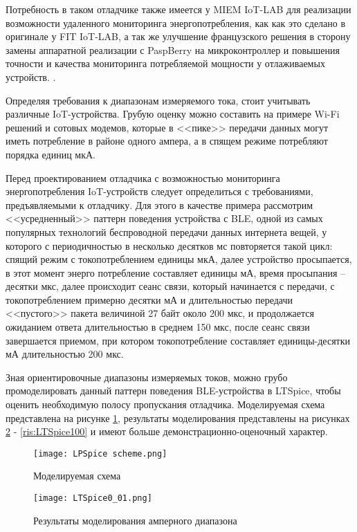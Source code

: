 Потребность в таком отладчике также имеется у MIEM IoT-LAB для реализации возможности удаленного 
мониторинга энергопотребления, как как это сделано в оригинале у FIT IoT-LAB, а так же улучшение 
французского решения в сторону замены аппаратной реализации с PaspBerry на микроконтроллер и повышения 
точности и качества мониторинга потребляемой мощности у отлаживаемых устройств. \cite{FITIoT}.

Определяя требования к диапазонам измеряемого тока, стоит учитывать различные IoT-устройства. Грубую оценку
можно составить на примере Wi-Fi решений и сотовых модемов, которые в <<пике>> передачи данных могут 
иметь потребление в районе одного ампера, а в спящем режиме потребляют порядка единиц мкА.


Перед проектированием отладчика с возможностью мониторинга энергопотребления IoT-устройств
следует определиться с требованиями, предъявляемыми к отладчику. 
Для этого в качестве примера рассмотрим <<усредненный>> паттерн поведения устройства с BLE, одной
из самых популярных технологий беспроводной передачи данных интернета вещей, 
у которого с периодичностью в несколько десятков мс повторяется такой цикл: спящий режим 
с токопотреблением единицы мкА, далее устройство просыпается, в этот момент
энерго потребление составляет единицы мА, время просыпания -- десятки мкс, далее происходит
сеанс связи, который начинается с передачи, с токопотреблением примерно десятки мА 
и длительностью передачи <<пустого>> пакета величиной 27 байт около 200 мкс, и продолжается 
ожиданием ответа длительностью в среднем 150 мкс, после сеанс связи завершается приемом,
при котором токопотребление составляет единицы-десятки мА длительностью 200 мкс.

Зная ориентировочные диапазоны измеряемых токов, можно грубо промоделировать данный паттерн 
поведения BLE-устройства в LTSpice, чтобы оценить необходимую полосу пропускания отладчика. 
Моделируемая схема представлена на рисунке \ref{ris:LTSpiceScheme}, результаты моделирования 
представлены на рисунках \ref{ris:LTSpice0_01} - \ref{ris:LTSpice100} и имеют больше 
демонстрационно-оценочный характер.

\begin{figure}[H]
  \centering
  \texttt{[image: LPSpice scheme.png]}
  \caption{Моделируемая схема}
  \label{ris:LTSpiceScheme}
\end{figure}

\begin{figure}[H]
  \centering
  \texttt{[image: LTSpice0\_01.png]}
  \caption{Результаты моделирования амперного диапазона }
  \label{ris:LTSpice0_01}
\end{figure}

